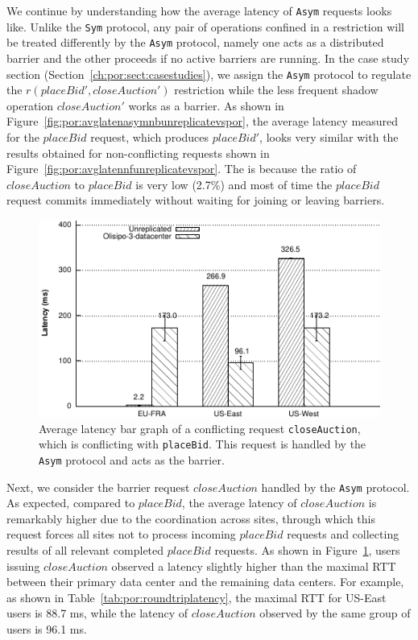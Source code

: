 We continue by understanding how the average latency of {\tt Asym} requests looks like. 
Unlike the {\tt Sym} protocol, any pair of operations confined in a restriction 
will be treated differently by the {\tt Asym} protocol, namely one acts
as a distributed barrier and the other proceeds if no active barriers are running. 
In the case study section (Section~\ref{ch:por:sect:casestudies}), we assign 
the {\tt Asym} protocol to regulate the $r(placeBid', closeAuction')$ restriction while 
the less frequent shadow operation $closeAuction'$ works as a barrier. As shown in 
Figure~\ref{fig:por:avglatenasymnbunreplicatevspor}, the average latency 
measured for the $placeBid$ request, which produces $placeBid'$, looks very similar
with the results obtained for non-conflicting requests shown in Figure~\ref{fig:por:avglatennfunreplicatevspor}.
The is because the ratio of $closeAuction$ to
$placeBid$ is very low (2.7\%) and most of time the $placeBid$ request 
commits immediately without waiting for joining or leaving barriers. 
\begin{figure}[t!]
  \centering
\includegraphics[width=0.85\columnwidth]{figures/por/eval/avg_latency_asym_closeauction_unreplicated_vs_por.pdf}
  \caption{Average latency bar graph of a conflicting request {\tt closeAuction},
  which is conflicting with {\tt placeBid}. This request is handled by the {\tt Asym}
  protocol and acts as the barrier.}
 \label{fig:por:avglatenasymbunreplicatevspor}
\end{figure}


Next, we consider the barrier request $closeAuction$ handled by 
the {\tt Asym} protocol. As expected, compared to $placeBid$, the average 
latency of $closeAuction$ is remarkably higher due to
the coordination across sites, through which this request forces all sites not to
process incoming $placeBid$ requests and collecting results of all relevant
completed $placeBid$ requests. As shown in 
Figure~\ref{fig:por:avglatenasymbunreplicatevspor}, users issuing
$closeAuction$ observed a latency slightly higher than the maximal RTT between 
their primary data center and the remaining data centers. For example, 
as shown in Table~\ref{tab:por:roundtriplatency}, the maximal RTT for US-East users
is 88.7 ms, while the latency of $closeAuction$ observed by 
the same group of users is 96.1 ms.

